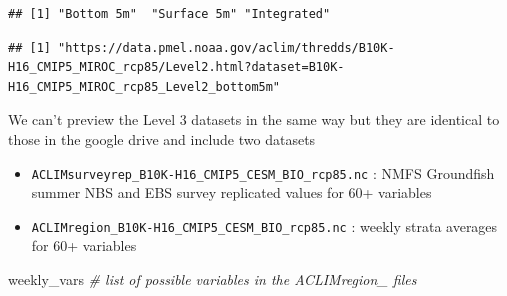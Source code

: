 \documentclass[
]{article}
\newenvironment{Shaded}{\begin{snugshade}}{\end{snugshade}}
\newcommand{\CommentTok}[1]{\textcolor[rgb]{0.56,0.35,0.01}{\textit{#1}}}
\newcommand{\NormalTok}[1]{#1}
\newcommand{\OperatorTok}[1]{\textcolor[rgb]{0.81,0.36,0.00}{\textbf{#1}}}
\newcommand{\StringTok}[1]{\textcolor[rgb]{0.31,0.60,0.02}{#1}}
\providecommand{\tightlist}{%
  \setlength{\itemsep}{0pt}\setlength{\parskip}{0pt}}
\begin{document}
\begin{verbatim}
## [1] "Bottom 5m"  "Surface 5m" "Integrated"
\end{verbatim}

\begin{Shaded}
\end{Shaded}

\begin{verbatim}
## [1] "https://data.pmel.noaa.gov/aclim/thredds/B10K-H16_CMIP5_MIROC_rcp85/Level2.html?dataset=B10K-H16_CMIP5_MIROC_rcp85_Level2_bottom5m"
\end{verbatim}

We can't preview the Level 3 datasets in the same way but they are
identical to those in the google drive and include two datasets

\begin{itemize}
\tightlist
\item
  \texttt{ACLIMsurveyrep\_B10K-H16\_CMIP5\_CESM\_BIO\_rcp85.nc} : NMFS
  Groundfish summer NBS and EBS survey replicated values for 60+
  variables
\item
  \texttt{ACLIMregion\_B10K-H16\_CMIP5\_CESM\_BIO\_rcp85.nc} : weekly
  strata averages for 60+ variables
\end{itemize}

\begin{Shaded}
\begin{Highlighting}[]
\NormalTok{    weekly_vars  }\CommentTok{# list of possible variables in the ACLIMregion_ files }
\end{Highlighting}
\end{Shaded}
\end{document}
